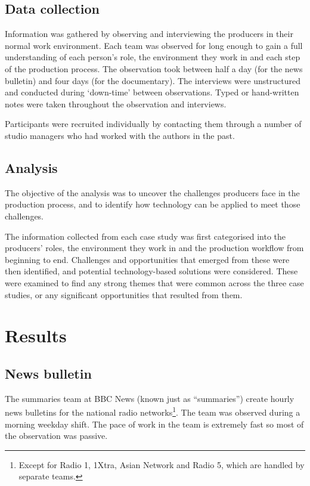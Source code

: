 \subsection{Data collection}
Information was gathered by observing and interviewing the producers in their normal work environment. Each team was
observed for long enough to gain a full understanding of each person's role, the environment they work in and each step
of the production process. The observation took between half a day (for the news bulletin) and four days (for the
documentary). The interviews were unstructured and conducted during `down-time' between observations.  Typed or
hand-written notes were taken throughout the observation and interviews.

Participants were recruited individually by contacting them through a number of studio managers who had worked with the
authors in the past. 

\subsection{Analysis}
The objective of the analysis was to uncover the challenges producers face in the production process, and to identify
how technology can be applied to meet those challenges.

The information collected from each case study was first categorised into the producers' roles, the environment they
work in and the production workflow from beginning to end. Challenges and opportunities that emerged from these were
then identified, and potential technology-based solutions were considered.  These were examined to find any strong
themes that were common across the three case studies, or any significant opportunities that resulted from them.

\section{Results}\label{sec:ethno-results}

\subsection{News bulletin}\label{sec:news}
The summaries team at BBC News (known just as ``summaries'') create hourly news bulletins for the national radio
networks\footnote{Except for Radio 1, 1Xtra, Asian Network and Radio 5, which are handled by separate teams.}. The team
was observed during a morning weekday shift. The pace of work in the team is extremely fast so most of the observation
was passive.

